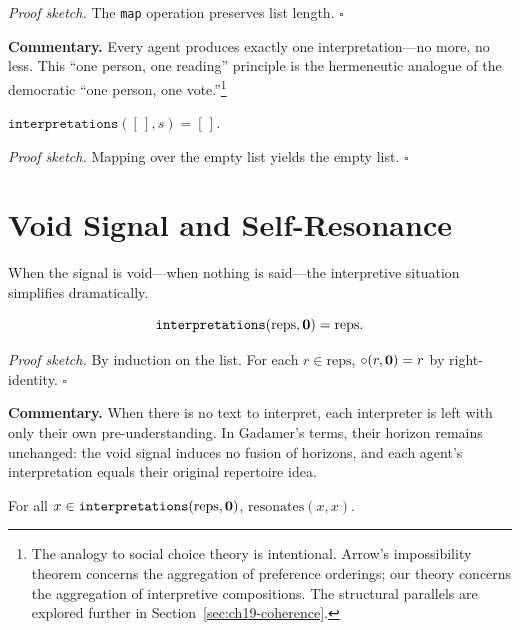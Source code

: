 \noindent\textit{Proof sketch.}\quad
The \texttt{map} operation preserves list length.
\hfill$\square$

\medskip

\noindent\textbf{Commentary.}
Every agent produces exactly one interpretation---no more, no less.  This
``one person, one reading'' principle is the hermeneutic analogue of the
democratic ``one person, one vote.''\footnote{The analogy to social choice
theory is intentional.  Arrow's impossibility theorem concerns the
aggregation of preference orderings; our theory concerns the aggregation of
interpretive compositions.  The structural parallels are explored further in
Section~\ref{sec:ch19-coherence}.}

\begin{theorem}
\label{thm:interpret_nil}
$\texttt{interpretations}([\,], s) = [\,]$.
\end{theorem}

\noindent\textit{Proof sketch.}\quad
Mapping over the empty list yields the empty list.
\hfill$\square$

\section{Void Signal and Self-Resonance}
\label{sec:ch19-void}

When the signal is void---when nothing is said---the interpretive situation
simplifies dramatically.

\begin{theorem}
\label{thm:void_signal_preserves}
\[
  \texttt{interpretations}(\text{reps}, \mathbf{0}) = \text{reps}.
\]
\end{theorem}

\noindent\textit{Proof sketch.}\quad
By induction on the list.  For each $r \in \text{reps}$, $\circ(r, \mathbf{0}) = r$
by right-identity.
\hfill$\square$

\medskip

\noindent\textbf{Commentary.}
When there is no text to interpret, each interpreter is left with only their
own pre-understanding.  In Gadamer's terms, their horizon remains unchanged:
the void signal induces no fusion of horizons, and each agent's
interpretation equals their original repertoire idea.

\begin{theorem}
\label{thm:void_signal_self_resonant}
For all $x \in \texttt{interpretations}(\text{reps}, \mathbf{0})$,
$\text{resonates}(x, x)$.
\end{theorem}

